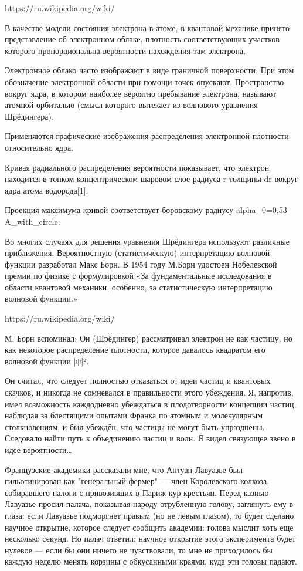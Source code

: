 https://ru.wikipedia.org/wiki/%
{
В качестве модели состояния электрона в атоме, в квантовой механике принято представление об электронном облаке, плотность соответствующих участков которого пропорциональна вероятности нахождения там электрона.

Электронное облако часто изображают в виде граничной поверхности. При этом обозначение электронной области при помощи точек опускают. Пространство вокруг ядра, в котором наиболее вероятно пребывание электрона, называют атомной орбиталью (смысл которого вытекает из волнового уравнения Шрёдингера).

Применяются графические изображения распределения электронной плотности относительно ядра.

Кривая радиального распределения вероятности показывает, что электрон находится в тонком концентрическом шаровом слое радиуса r толщины dr вокруг ядра атома водорода[1].

Проекция максимума кривой соответствует боровскому радиусу alpha_0=0,53 A_with_circle.

Во многих случаях для решения уравнения Шрёдингера используют различные приближения. Вероятностную (статистическую) интерпретацию волновой функции разработал Макс Борн. В 1954 году М.Борн удостоен Нобелевской премии по физике с формулировкой «За фундаментальные исследования в области квантовой механики, особенно, за статистическую интерпретацию волновой функции.»
}

https://ru.wikipedia.org/wiki/%
{
М. Борн вспоминал:
Он (Шрёдингер) рассматривал электрон не как частицу, но как некоторое распределение плотности, которое давалось квадратом его волновой функции |ψ|².

Он считал, что следует полностью отказаться от идеи частиц и квантовых скачков, и никогда не сомневался в правильности этого убеждения. Я, напротив, имел возможность каждодневно убеждаться в плодотворности концепции частиц, наблюдая за блестящими опытами Франка по атомным и молекулярным столкновениям, и был убеждён, что частицы не могут быть упразднены. Следовало найти путь к объединению частиц и волн. Я видел связующее звено в идее вероятности…
}


Французские академики рассказали мне, что Антуан Лавуазье был гильотинирован как "генеральный фермер" — член Королевского колхоза, собиравшего налоги с привозивших в Париж кур крестьян. Перед казнью Лавуазье просил палача, показывая народу отрубленную голову, заглянуть ему в глаза: если Лавуазье подморгнет правым (но не левым глазом), то будет сделано научное открытие, которое следует сообщить академии: голова мыслит хоть еще несколько секунд. 
Но палач ответил: научное открытие этого эксперимента будет нулевое — если бы они ничего не чувствовали, то мне не приходилось бы каждую неделю менять корзины с обкусанными краями, куда эти головы падают.


